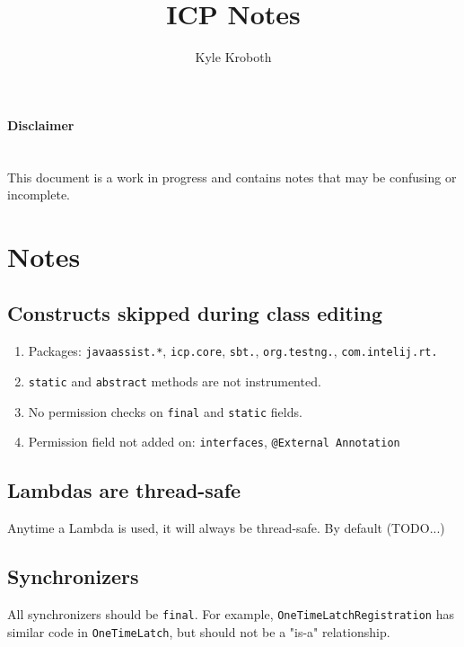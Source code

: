 \documentclass[11pt]{article}
\begin{document}
    \title{ICP Notes}
    \author{Kyle Kroboth}
    \maketitle

    \paragraph{Disclaimer}\mbox{} \\
    This document is a work in progress and contains notes that may be confusing or incomplete.

    \tableofcontents

    \section{Notes}

    \subsection{Constructs skipped during class editing}
    \begin{enumerate}
        \item Packages: \verb|javaassist.*|, \verb|icp.core|, \verb|sbt.|, \verb|org.testng.|,
        \verb|com.intelij.rt.|

        \item \verb|static| and \verb|abstract| methods are not instrumented.

        \item No permission checks on \verb|final| and \verb|static| fields.

        \item Permission field not added on: \verb|interfaces|, \verb|@External Annotation|
    \end{enumerate}


    \subsection{Lambdas are thread-safe}
    Anytime a Lambda is used, it will always be thread-safe. By default (TODO...)

    \subsection{Synchronizers}
    All synchronizers should be \lstinline{final}. For example, \lstinline{OneTimeLatchRegistration}
    has similar code in \lstinline{OneTimeLatch}, but should not be a "is-a" relationship.
\end{document}
